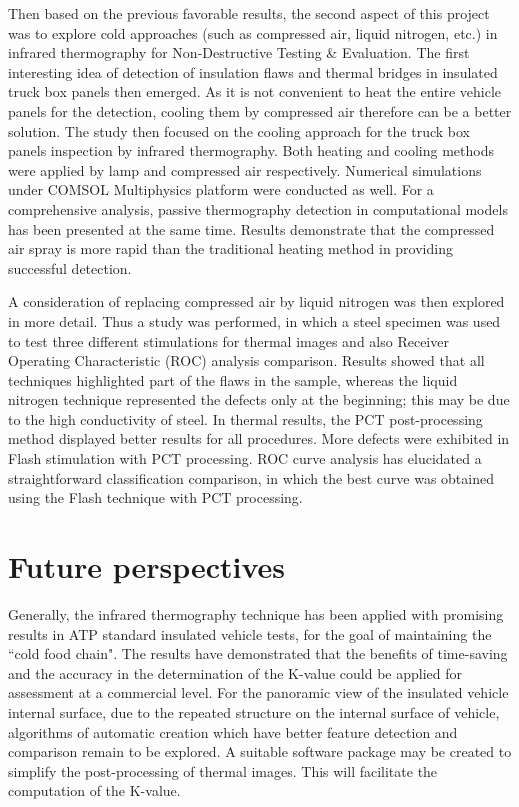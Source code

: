 Then based on the previous favorable results, the second aspect of this project was to explore cold approaches (such as compressed air, liquid nitrogen, etc.) in infrared thermography for Non-Destructive Testing \& Evaluation. The first interesting idea of detection of insulation flaws and thermal bridges in insulated truck box panels then emerged. As it is not convenient to heat the entire vehicle panels for the detection, cooling them by compressed air therefore can be a better solution. The study then focused on the cooling approach for the truck box panels inspection by infrared thermography. Both heating and cooling methods were applied by lamp and compressed air respectively. Numerical simulations under COMSOL Multiphysics{\textregistered} platform were conducted as well. For a comprehensive analysis, passive thermography detection in computational models has been presented at the same time. Results demonstrate that the compressed air spray is more rapid than the traditional heating method in providing successful detection.

A consideration of replacing compressed air by liquid nitrogen was then explored in more detail. Thus a study was performed, in which a steel specimen was used to test three different stimulations for thermal images and also Receiver Operating Characteristic (ROC) analysis comparison. Results showed that all techniques highlighted part of the flaws in the sample, whereas the liquid nitrogen technique represented the defects only at the beginning; this may be due to the high conductivity of steel. In thermal results, the PCT post-processing method displayed better results for all procedures. More defects were exhibited in Flash stimulation with PCT processing. ROC curve analysis has elucidated a straightforward classification comparison, in which the best curve was obtained using the Flash technique with PCT processing. 



\section{Future perspectives}
Generally, the infrared thermography technique has been applied with promising results in ATP standard insulated vehicle tests, for the goal of maintaining the ``cold food chain". The results have demonstrated that the benefits of time-saving and the accuracy in the determination of the K-value could be applied for assessment at a commercial level.  For the panoramic view of the insulated vehicle internal surface, due to the repeated structure on the internal surface of vehicle, algorithms of automatic creation which have better feature detection and comparison remain to be explored.  A suitable software package may be created to simplify the post-processing of thermal images. This will facilitate the computation of the K-value.

